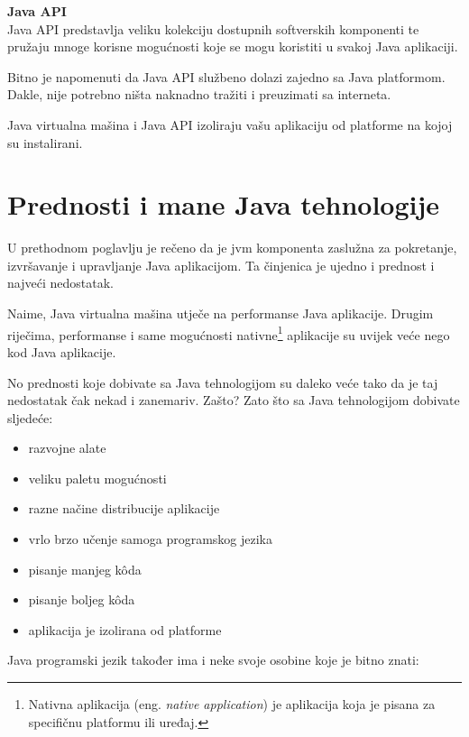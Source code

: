 \textbf{Java API}\\
Java API predstavlja veliku kolekciju dostupnih softverskih komponenti te pružaju mnoge korisne mogućnosti koje se mogu koristiti u svakoj Java aplikaciji.

Bitno je napomenuti da Java API službeno dolazi zajedno sa Java platformom. Dakle, nije potrebno ništa naknadno tražiti i preuzimati sa interneta.

\begin{infobox}
    Java virtualna mašina i Java API izoliraju vašu aplikaciju od platforme na kojoj su instalirani.
\end{infobox}

\section{Prednosti i mane Java tehnologije}
U prethodnom poglavlju je rečeno da je \gls{jvm} komponenta zaslužna za pokretanje, izvršavanje i upravljanje Java aplikacijom. Ta činjenica je ujedno i prednost i najveći nedostatak.

Naime, Java virtualna mašina utječe na performanse Java aplikacije. Drugim riječima, performanse i same mogućnosti nativne\footnote{Nativna aplikacija (eng. \emph{native application}) je aplikacija koja je pisana za specifičnu platformu ili uređaj.} aplikacije su uvijek veće nego kod Java aplikacije.

No prednosti koje dobivate sa Java tehnologijom su daleko veće tako da je taj nedostatak čak nekad i zanemariv. Zašto? Zato što sa Java tehnologijom dobivate sljedeće:

\begin{itemize}
    \item razvojne alate
    \item veliku paletu mogućnosti
    \item razne načine distribucije aplikacije
    \item vrlo brzo učenje samoga programskog jezika
    \item pisanje manjeg kôda
    \item pisanje boljeg kôda
    \item aplikacija je izolirana od platforme
\end{itemize}

Java programski jezik također ima i neke svoje osobine koje je bitno znati:

